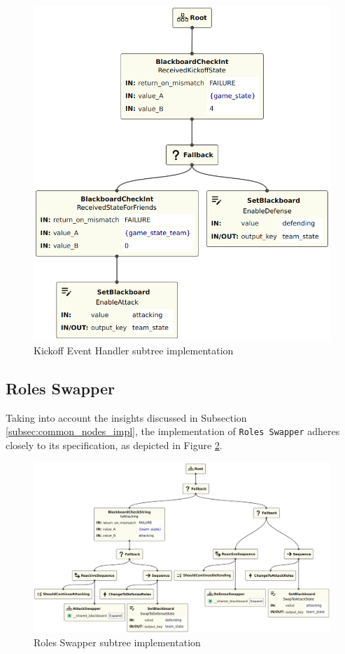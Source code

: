 \begin{figure}[!h]
    \centering
    \includegraphics[width=0.65\linewidth]{chapters/development/images/KickoffEventHandler.png}
    \caption{Kickoff Event Handler subtree implementation}
    \label{fig:kickoff_event_handler_impl}
\end{figure}

\subsection{Roles Swapper}

Taking into account the insights discussed in Subsection \ref{subsec:common_nodes_impl}, the implementation of \texttt{Roles Swapper} adheres closely to its specification, as depicted in Figure \ref{fig:roles_swapper_impl}.

\begin{figure}[!h]
    \centering
    \includegraphics[width=1.0\linewidth]{chapters/development/images/RolesSwapper.png}
    \caption{Roles Swapper subtree implementation}
    \label{fig:roles_swapper_impl}
\end{figure}

